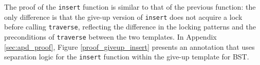 \documentclass[a4paper,UKenglish,cleveref, autoref, thm-restate]{lipics-v2021}
\newcommand{\treerep}{\ensuremath{\mathsf{Node}}}
\newcommand{\nodeboxrep}{\ensuremath{\mathsf{Node\_ref}}}
\newcommand{\infp}{\ensuremath{\mathsf{InFP}}}
\begin{document}



The proof of the \lstinline{insert} function is similar to that of the previous function: the only difference is that the give-up version of \lstinline{insert} does not acquire a lock before calling \lstinline{traverse}, reflecting the difference in the locking patterns and the preconditions of \lstinline{traverse} between the two templates. In Appendix \ref{sec:apd_proof}, Figure \ref{proof_giveup_insert} presents an annotation that uses separation logic for the \texttt{insert} function within the give-up template for BST.
\end{document}
